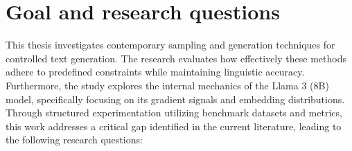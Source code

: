 \documentclass[11pt]{article}
\begin{document}

\section{Goal and research questions}

This thesis investigates contemporary sampling and generation techniques for controlled text generation. The research evaluates how effectively these methods adhere to predefined constraints while maintaining linguistic accuracy. Furthermore, the study explores the internal mechanics of the Llama 3 (8B) model, specifically focusing on its gradient signals and embedding distributions. Through structured experimentation utilizing benchmark datasets and metrics, this work addresses a critical gap identified in the current literature, leading to the following research questions: 

\end{document}
